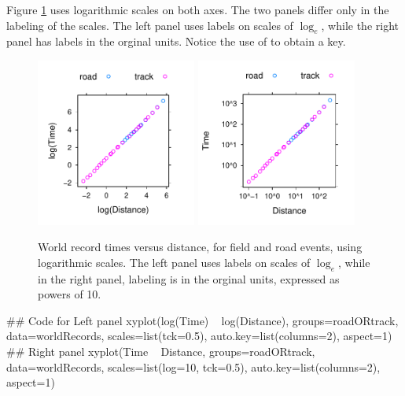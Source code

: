 Figure \ref{fig:wrlog} uses logarithmic scales on both axes.  The two
panels differ only in the labeling of the scales.  The left panel uses
labels on scales of $\log_e$, while the right panel has labels in the
orginal units.  Notice the use of
 to obtain a key.

\begin{figure}
\begin{Schunk}


\centerline{\includegraphics[width=0.47\textwidth]{figs/03-wrTimesAB-1} \includegraphics[width=0.47\textwidth]{figs/03-wrTimesAB-2} }

\end{Schunk}
\caption{World record times versus distance, for field and road
  events, using logarithmic scales.  The left panel uses labels on
  scales of $\log_e$, while in the right panel, labeling is in the
  orginal units, expressed as powers of 10.}
\label{fig:wrlog}
\end{figure}

\begin{Schunk}
\begin{Sinput}
## Code for Left panel
xyplot(log(Time) ~ log(Distance),
       groups=roadORtrack, data=worldRecords,
       scales=list(tck=0.5),
       auto.key=list(columns=2), aspect=1)
## Right panel
xyplot(Time ~ Distance, groups=roadORtrack,
       data=worldRecords,
       scales=list(log=10, tck=0.5),
       auto.key=list(columns=2), aspect=1)
\end{Sinput}
\end{Schunk}
\vspace*{-9pt}

